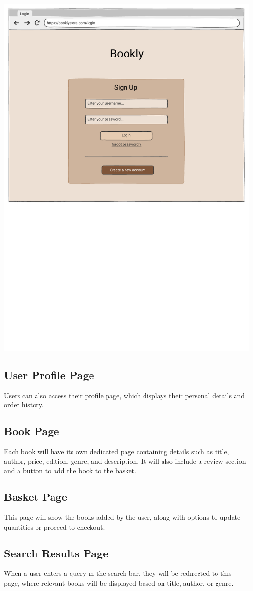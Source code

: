 \includegraphics[width=\textwidth]{signin.png}

\subsection{User Profile Page} \label{sec:profile}
Users can also access their profile page, which displays their personal details and order history.

\subsection{Book Page} \label{sec:book}
Each book will have its own dedicated page containing details such as title, author, price, edition, genre, and description. It will also include a review section and a button to add the book to the basket.

\subsection{Basket Page} \label{sec:basket}
This page will show the books added by the user, along with options to update quantities or proceed to checkout.

\subsection{Search Results Page} \label{sec:search}
When a user enters a query in the search bar, they will be redirected to this page, where relevant books will be displayed based on title, author, or genre.